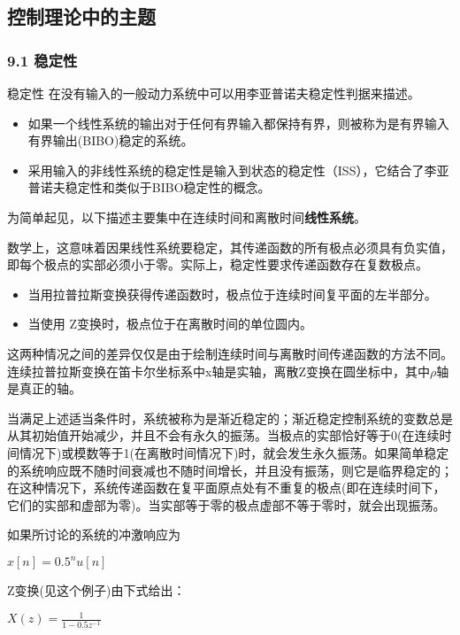 \subsection{控制理论中的主题}

\subsubsection{9.1 稳定性}

稳定性 在没有输入的一般动力系统中可以用李亚普诺夫稳定性判据来描述。

\begin{itemize}
\item 如果一个线性系统的输出对于任何有界输入都保持有界，则被称为是有界输入有界输出(BIBO)稳定的系统。
\item 采用输入的非线性系统的稳定性是输入到状态的稳定性（ISS），它结合了李亚普诺夫稳定性和类似于BIBO稳定性的概念。
\end{itemize}

为简单起见，以下描述主要集中在连续时间和离散时间\textbf{线性系统}。

数学上，这意味着因果线性系统要稳定，其传递函数的所有极点必须具有负实值，即每个极点的实部必须小于零。实际上，稳定性要求传递函数存在复数极点。

\begin{itemize}
\item 当用拉普拉斯变换获得传递函数时，极点位于连续时间复平面的左半部分。
\item 当使用 Z变换时，极点位于在离散时间的单位圆内。
\end{itemize}

这两种情况之间的差异仅仅是由于绘制连续时间与离散时间传递函数的方法不同。连续拉普拉斯变换在笛卡尔坐标系中x轴是实轴，离散Z变换在圆坐标中，其中$\rho
$轴是真正的轴。

当满足上述适当条件时，系统被称为是渐近稳定的；渐近稳定控制系统的变数总是从其初始值开始减少，并且不会有永久的振荡。当极点的实部恰好等于0(在连续时间情况下)或模数等于1(在离散时间情况下)时，就会发生永久振荡。如果简单稳定的系统响应既不随时间衰减也不随时间增长，并且没有振荡，则它是临界稳定的；在这种情况下，系统传递函数在复平面原点处有不重复的极点(即在连续时间下，它们的实部和虚部为零)。当实部等于零的极点虚部不等于零时，就会出现振荡。

如果所讨论的系统的冲激响应为

$x[n] = 0.5^n u[n]$

Z变换(见这个例子)由下式给出：

$X(z) = \frac{1}{1 - 0.5z^{-1}}$

